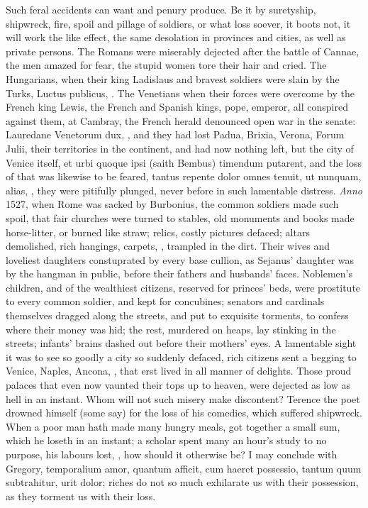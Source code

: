 {{Such feral accidents can want and penury produce. Be it by suretyship,
shipwreck, fire, spoil and pillage of soldiers, or what loss soever, it
boots not, it will work the like effect, the same desolation in
provinces and cities, as well as private persons. The Romans were
miserably dejected after the battle of Cannae, the men amazed for fear,
the stupid women tore their hair and cried. The Hungarians, when their
king Ladislaus and bravest soldiers were slain by the Turks, Luctus
publicus, \etc{}. The Venetians when their forces were overcome by the
French king Lewis, the French and Spanish kings, pope, emperor, all
conspired against them, at Cambray, the French herald denounced open
war in the senate: Lauredane Venetorum dux, \etc{}, and they had lost
Padua, Brixia, Verona, Forum Julii, their territories in the continent,
and had now nothing left, but the city of Venice itself, et urbi quoque
ipsi (saith Bembus) timendum putarent, and the loss of that was
likewise to be feared, tantus repente dolor omnes tenuit, ut nunquam,
alias, \etc{}, they were pitifully plunged, never before in such
lamentable distress. \emph{Anno} 1527, when Rome was sacked by Burbonius,
the common soldiers made such spoil, that fair churches were
turned to stables, old monuments and books made horse-litter, or burned
like straw; relics, costly pictures defaced; altars demolished, rich
hangings, carpets, \etc{}, trampled in the dirt. Their wives and
loveliest daughters constuprated by every base cullion, as Sejanus'
daughter was by the hangman in public, before their fathers and
husbands' faces. Noblemen's children, and of the wealthiest citizens,
reserved for princes' beds, were prostitute to every common soldier,
and kept for concubines; senators and cardinals themselves dragged
along the streets, and put to exquisite torments, to confess where
their money was hid; the rest, murdered on heaps, lay stinking in the
streets; infants' brains dashed out before their mothers' eyes. A
lamentable sight it was to see so goodly a city so suddenly defaced,
rich citizens sent a begging to Venice, Naples, Ancona, \etc{}, that erst
lived in all manner of delights. Those proud palaces that even
now vaunted their tops up to heaven, were dejected as low as hell in an
instant. Whom will not such misery make discontent? Terence the poet
drowned himself (some say) for the loss of his comedies, which suffered
shipwreck. When a poor man hath made many hungry meals, got together a
small sum, which he loseth in an instant; a scholar spent many an
hour's study to no purpose, his labours lost, \etc{}, how should it
otherwise be? I may conclude with Gregory, temporalium amor, quantum
afficit, cum haeret possessio, tantum quum subtrahitur, urit dolor;
riches do not so much exhilarate us with their possession, as they
torment us with their loss.

}}
